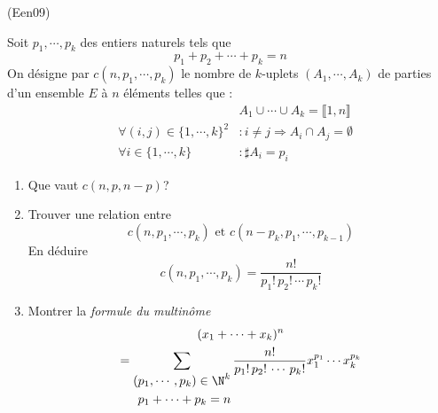\begin{tiny}(Een09)\end{tiny} 
Soit $p_1,\cdots,p_k$ des entiers naturels tels que
\begin{displaymath}
 p_1+p_2+\cdots+p_k = n
\end{displaymath}
On désigne par $c(n,p_1,\cdots,p_k)$ le nombre de $k$-uplets $(A_1,\cdots,A_k)$ de parties d'un ensemble $E$ à $n$ éléments telles que :
\begin{align*}
 & & A_1 \cup \cdots \cup A_k = \llbracket 1,n \rrbracket \\
 &\forall (i,j)\in \{1,\cdots,k\}^2 &: i\neq j \Rightarrow A_i \cap A_j = \emptyset \\
 &\forall i\in \{1,\cdots,k\} &: \sharp A_i = p_i
\end{align*}
\begin{enumerate}
 \item Que vaut $c(n,p,n-p)$?
\item Trouver une relation entre 
\begin{displaymath}
c(n,p_1,\cdots,p_k) \text{ et } c(n-p_k,p_1,\cdots,p_{k-1})
\end{displaymath}
En déduire
\begin{displaymath}
 c(n,p_1,\cdots,p_k) = \dfrac{n!}{p_1!\,p_2!\,\cdots\,p_k!}
\end{displaymath}
\item Montrer la \emph{formule du multinôme}
\begin{multline*}
 (x_1+\cdots+x_k)^n \\
= \sum_{
\begin{aligned}
 (p_1,\cdots,p_k)\in\N^k \\
 p_1+\cdots +p_k =n
\end{aligned}
}
\dfrac{n!}{p_1!\,p_2!\,\cdots\,p_k!} x_1^{p_1} \cdots x_k^{p_k}
\end{multline*}

\end{enumerate}
